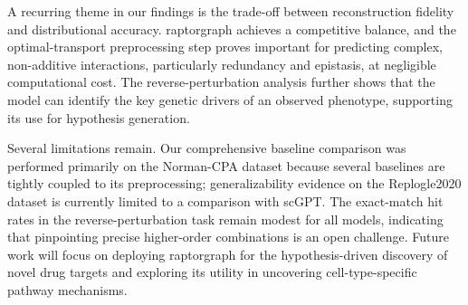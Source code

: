 \documentclass[10pt,letterpaper]{article}
\theoremstyle{definition}
\theoremstyle{remark}
\begin{document}
A recurring theme in our findings is the trade-off between reconstruction fidelity and distributional accuracy. \gls{raptorgraph} achieves a competitive balance, and the optimal-transport preprocessing step proves important for predicting complex, non-additive interactions, particularly redundancy and epistasis, at negligible computational cost.
The reverse-perturbation analysis further shows that the model can identify the key genetic drivers of an observed phenotype, supporting its use for hypothesis generation.

Several limitations remain. Our comprehensive baseline comparison was performed primarily on the Norman-CPA dataset because several baselines are tightly coupled to its preprocessing; generalizability evidence on the Replogle2020 dataset is currently limited to a comparison with scGPT.
The exact-match hit rates in the reverse-perturbation task remain modest for all models, indicating that pinpointing precise higher-order combinations is an open challenge.
Future work will focus on deploying \gls{raptorgraph} for the hypothesis-driven discovery of novel drug targets and exploring its utility in uncovering cell-type-specific pathway mechanisms.




\end{document}
